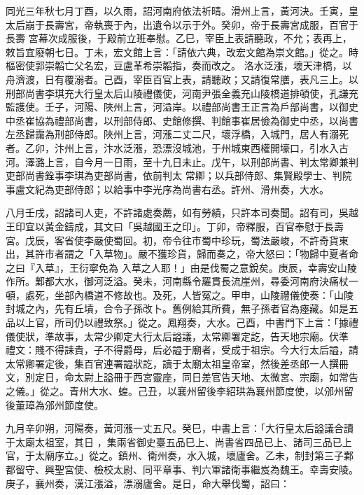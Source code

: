 
\begin{pinyinscope}
同光三年秋七月丁酉，以久雨，詔河南府依法祈晴。滑州上言，黃河決。壬寅，皇太后崩于長壽宮，帝執喪于內，出遺令以示于外。癸卯，帝于長壽宮成服，百官于長壽
 宮幕次成服後，于殿前立班奉慰。乙巳，宰臣上表請聽政，不允；表再上，敕旨宜廢朝七日。丁未，宏文館上言：「請依六典，改宏文館為崇文館。」從之。時樞密使郭崇韜亡父名宏，豆盧革希崇韜指，奏而改之。
 洛水泛漲，壞天津橋，以舟濟渡，日有覆溺者。己酉，宰臣百官上表，請聽政；又請復常膳，表凡三上。以刑部尚書李琪充大行皇太后山陵禮儀使，河南尹張全義充山陵橋道排頓使，孔謙充
 監護使。壬子，河陽、陜州上言，河溢岸。以禮部尚書王正言為戶部尚書，以御史中丞崔協為禮部尚書，以刑部侍郎、史館修撰、判館事崔居儉為御史中丞，以尚書左丞歸靄為刑部侍郎。陜州上言，河漲二丈二尺，壞浮橋，入城門，居人有溺死者。乙卯，汴州上言，汴水泛漲，恐漂沒城池，于州城東西權開壕口，引水入古河。澤潞上言，自今月一日雨，至十九日未止。戊午，以刑部尚書、判太常卿兼判吏部尚書銓事李琪為吏部尚書，依前判太
 常卿；以兵部侍郎、集賢殿學士、判院事盧文紀為吏部侍郎；以給事中李光序為尚書右丞。許州、滑州奏，大水。



 八月壬戌，詔諸司人吏，不許諸處奏薦，如有勞績，只許本司奏聞。詔有司，吳越王印宜以黃金鑄成，其文曰「吳越國王之印」。丁卯，帝釋服，百官奉慰于長壽宮。戊辰，客省使李嚴使蜀回。初，帝令往市蜀中珍玩，蜀法嚴峻，不許奇貨東出，其許市者謂之「入草物」。嚴不獲珍貨，歸而奏之，帝大怒曰：「物歸中夏者命之曰『入草』，王衍寧免為
 入草之人耶！」由是伐蜀之意銳矣。庚辰，幸壽安山陵作所。鄴都大水，御河泛溢。癸未，河南縣令羅貫長流崖州，尋委河南府決痛杖一頓，處死，坐部內橋道不修故也。及死，人皆冤之。甲申，山陵禮儀使奏：「山陵封城之內，先有丘墳，合令子孫改卜。舊例給其所費，無子孫者官為瘞藏。如是五品以上官，所司仍以禮致祭。」從之。鳳翔奏，大水。己酉，中書門下上言：「據禮儀使狀，準故事，太常少卿定大行太后謚議，太常卿署定訖，告天地宗廟。伏準
 禮文：賤不得誄貴，子不得爵母，后必謚于廟者，受成于祖宗。今大行太后謚，請太常卿署定後，集百官連署謚狀訖，讀于太廟太祖皇帝室，然後差丞郎一人撰冊文，別定日，命太尉上謚冊于西宮靈座，同日差官告天地、太微宮、宗廟，如常告之儀。」從之。青州大水、蝗。己丑，以襄州留後李紹珙為襄州節度使，以邠州留後董璋為邠州節度使。



 九月辛卯朔，河陽奏，黃河漲一丈五尺。癸巳，中書上言：「大行皇太后謚議合讀于太廟太祖室，其日
 ，集兩省御史臺五品巳上、尚書省四品已上、諸司三品已上官，于太廟序立。」從之。鎮州、衛州奏，水入城，壞廬舍。乙未，制封第三子鄴都留守、興聖宮使、檢校太尉、同平章事、判六軍諸衛事繼岌為魏王。幸壽安陵。庚子，襄州奏，漢江漲溢，漂溺廬舍。是日，命大舉伐蜀，詔曰：




\end{pinyinscope}
